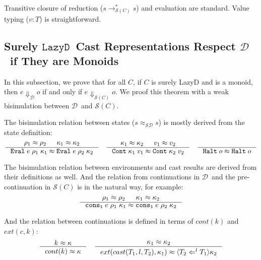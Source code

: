 \documentclass[acmsmall,review,anonymous]{acmart}\settopmatter{printfolios=true,printccs=false,printacmref=false}
\newcommand{\judgeType}[2]{#1 : #2}
\newcommand{\lazyD}{$\mathtt{Lazy D}$}
\newcommand{\sOOinspect}[3]{\mathtt{Eval} \; #1 \; #2 \; #3}
\newcommand{\sOOreturn}[2]{\mathtt{Cont} \; #2 \; #1}
\newcommand{\sOOhalt}[1]{\mathtt{Halt} \; #1}
\newcommand{\cOOcast}[3]{#3 \Leftarrow^{#2} #1}
\newcommand{\kOOconsI}[3]{\mathtt{cons_1} \; #1 \; #2 \; #3}
\newcommand{\kOOcast}[2]{
	\langle #1 \rangle #2}
\newcommand{\judgeSreduceTrans}[3]{#2 \longrightarrow_{\mathcal{S}(#1)}^{*} #3}
\newcommand{\judgeSeval}[3]{#2 \Downarrow_{\mathcal{S}(#1)} #3}
\newcommand{\eqvSD}[3]{#2 \approx_{\mathcal{SD}} #3}
\newcommand{\ineffCEKD}{$ \mathcal{D} $}
\newcommand{\judgeDeval}[2]{#1 \Downarrow_{\mathcal{D}} #2}
\newcommand{\effCEK}[1]{$ \mathcal{S}(#1) $}
\begin{document}
Transitive closure of reduction ($ \judgeSreduceTrans{C}{s}{s} $) and 
evaluation are standard. Value typing ($ \judgeType{v}{T} $) is straightforward.

\subsection{Surely \lazyD\ Cast Representations Respect \ineffCEKD\ if They are 
Monoids}
\label{secc:framework:monoid-correct}


In this subsection, we prove that for all $ C $, if $ C $ is surely LazyD and 
is a monoid, then $ \judgeDeval{e}{o} $ if and only if $ \judgeSeval{C}{e}{o} 
$. We proof this theorem with a weak bisimulation between \ineffCEKD\ and 
\effCEK{C}. 

The bisimulation relation between states ($\eqvSD{C}{s}{s}$) is mostly derived 
from the state definition: \begin{gather*}
\inference{
	\rho_1 \approx \rho_2 &
	\kappa_1 \approx \kappa_2
}{
	\sOOinspect{e}{\rho_1}{\kappa_1} \approx \sOOinspect{e}{\rho_2}{\kappa_2}
}
\quad
\inference{
	\kappa_1 \approx \kappa_2 &
	v_1 \approx v_2
}{
	\sOOreturn{v_1}{\kappa_1} \approx \sOOreturn{v_2}{\kappa_2}
}
\quad
\inference{
}{
	\sOOhalt{o} \approx \sOOhalt{o}
}
\end{gather*}

The bisimulation relation between environments and cast results are derived 
from their definitions as well. And the relation from continuations in 
\ineffCEKD\ and the pre-continuation in \effCEK{C} is in the natural way, for 
example: \begin{gather*}
\inference{
	\rho_1 \approx \rho_2 &
	\kappa_1 \approx \kappa_2
}{
	\kOOconsI{e}{\rho_1}{\kappa_1} \approx \kOOconsI{e}{\rho_2}{\kappa_2}
}
\end{gather*}

And the relation between continuations is defined in terms of $ cont(k) $ and $ 
ext(c,k) $: \begin{gather*}
\inference{
	k \approx \kappa
}{
	cont(k) \approx \kappa
}
\quad
\inference{
	\kappa_1 \approx \kappa_2
}{
	ext(cast(T_1,l,T_2),\kappa_1)
	\approx
	\kOOcast{\cOOcast{T_1}{l}{T_2}}{\kappa_2} 
}
\end{gather*}
\end{document}
